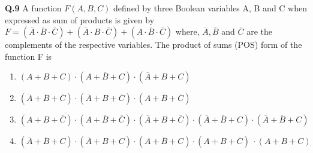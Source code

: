\documentclass{article}
\providecommand{\brak}[1]{\ensuremath{\left(#1\right)}}
\begin{document}
\textbf{Q.9} A function $F(A, B, C)$ defined by three Boolean variables A, B and C when expressed as sum
of products is given by \newline$ F = \brak{\overline{A} \cdot \overline{B} \cdot \overline{C}} + \brak{\overline{A} \cdot B \cdot \overline{C}} + \brak{A \cdot \overline{B} \cdot \overline{C}} $
where, $\overline{A},\overline{B}$ and $\overline{C}$ are the complements of the respective variables. The product of sums (POS) form of the function 
F is
        \begin{enumerate}[label=(\Alph*)]
                \item $ \brak{A+B+C} \cdot \brak{A+\overline{B}+C} \cdot \brak{\overline{A}+B+C} $
                \item $ \brak{\overline{A}+\overline{B}+\overline{C}} \cdot \brak{\overline{A}+B+\overline{C}} \cdot \brak{A+\overline{B}+\overline{C}
} $
                \item $ \brak{A+B+\overline{C}} \cdot \brak{A+\overline{B}+\overline{C}} \cdot \brak{\overline{A}+B+\overline{C}} \cdot \brak{\overline{A}+\overline{B}+C} \cdot \brak{\overline{A}+\overline{B}+C} $
                \item $ \brak{\overline{A}+\overline{B}+C} \cdot \brak{\overline{A}+B+C} \cdot \brak{A+\overline{B}+C} \cdot \brak{A+B+\overline{C}} \
\cdot \brak{A+B+C} $

        \end{enumerate}
\end{document}
